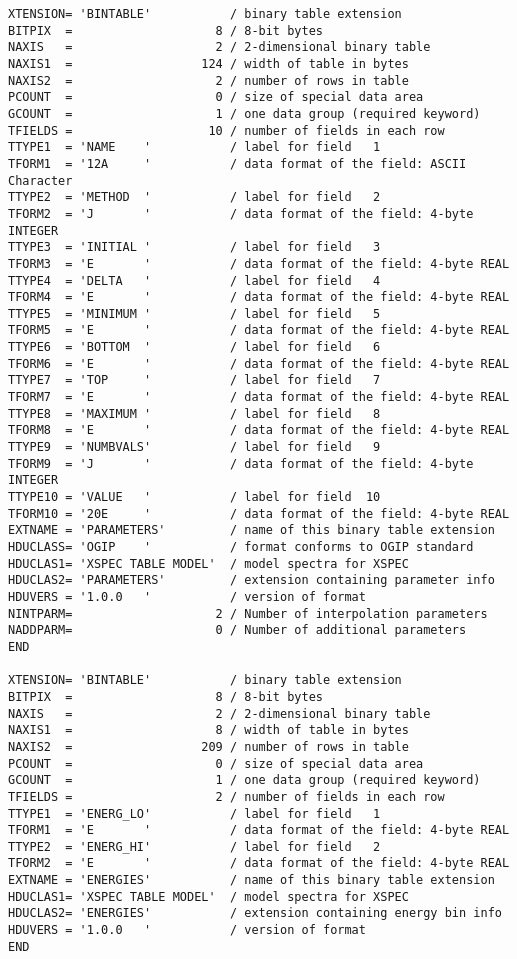 \documentclass[11pt]{article}
\begin{document}
\begin{verbatim}
XTENSION= 'BINTABLE'           / binary table extension
BITPIX  =                    8 / 8-bit bytes
NAXIS   =                    2 / 2-dimensional binary table
NAXIS1  =                  124 / width of table in bytes
NAXIS2  =                    2 / number of rows in table
PCOUNT  =                    0 / size of special data area
GCOUNT  =                    1 / one data group (required keyword)
TFIELDS =                   10 / number of fields in each row
TTYPE1  = 'NAME    '           / label for field   1
TFORM1  = '12A     '           / data format of the field: ASCII Character
TTYPE2  = 'METHOD  '           / label for field   2
TFORM2  = 'J       '           / data format of the field: 4-byte INTEGER
TTYPE3  = 'INITIAL '           / label for field   3
TFORM3  = 'E       '           / data format of the field: 4-byte REAL
TTYPE4  = 'DELTA   '           / label for field   4
TFORM4  = 'E       '           / data format of the field: 4-byte REAL
TTYPE5  = 'MINIMUM '           / label for field   5
TFORM5  = 'E       '           / data format of the field: 4-byte REAL
TTYPE6  = 'BOTTOM  '           / label for field   6
TFORM6  = 'E       '           / data format of the field: 4-byte REAL
TTYPE7  = 'TOP     '           / label for field   7
TFORM7  = 'E       '           / data format of the field: 4-byte REAL
TTYPE8  = 'MAXIMUM '           / label for field   8
TFORM8  = 'E       '           / data format of the field: 4-byte REAL
TTYPE9  = 'NUMBVALS'           / label for field   9
TFORM9  = 'J       '           / data format of the field: 4-byte INTEGER
TTYPE10 = 'VALUE   '           / label for field  10
TFORM10 = '20E     '           / data format of the field: 4-byte REAL
EXTNAME = 'PARAMETERS'         / name of this binary table extension
HDUCLASS= 'OGIP    '           / format conforms to OGIP standard
HDUCLAS1= 'XSPEC TABLE MODEL'  / model spectra for XSPEC
HDUCLAS2= 'PARAMETERS'         / extension containing parameter info
HDUVERS = '1.0.0   '           / version of format
NINTPARM=                    2 / Number of interpolation parameters
NADDPARM=                    0 / Number of additional parameters
END
 
XTENSION= 'BINTABLE'           / binary table extension
BITPIX  =                    8 / 8-bit bytes
NAXIS   =                    2 / 2-dimensional binary table
NAXIS1  =                    8 / width of table in bytes
NAXIS2  =                  209 / number of rows in table
PCOUNT  =                    0 / size of special data area
GCOUNT  =                    1 / one data group (required keyword)
TFIELDS =                    2 / number of fields in each row
TTYPE1  = 'ENERG_LO'           / label for field   1
TFORM1  = 'E       '           / data format of the field: 4-byte REAL
TTYPE2  = 'ENERG_HI'           / label for field   2
TFORM2  = 'E       '           / data format of the field: 4-byte REAL
EXTNAME = 'ENERGIES'           / name of this binary table extension
HDUCLAS1= 'XSPEC TABLE MODEL'  / model spectra for XSPEC
HDUCLAS2= 'ENERGIES'           / extension containing energy bin info
HDUVERS = '1.0.0   '           / version of format
END
 

\end{verbatim}
\end{document}

